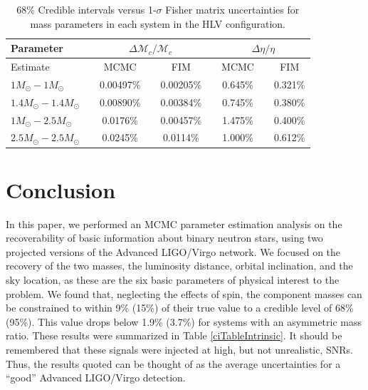 \documentclass[11pt,a4paper]{emulateapj} 
\begin{document}
\begin{table}[b!]
\centering
\caption{68\% Credible intervals versus 1-$\sigma$ Fisher matrix uncertainties for mass parameters in each system in the HLV configuration.}
  \tabcolsep=0.11cm
    {\renewcommand{\arraystretch}{1.3} 
\begin{tabular}{lcccccccc}

\hline\hline Parameter & \vline & \multicolumn{3}{c}{$\Delta\mathcal{M}_c / \mathcal{M}_c$} & \vline & \multicolumn{3}{c}{$\Delta \eta / \eta$} \\ \hline \hline

Estimate & \vline & MCMC & \vline & FIM & \vline & MCMC & \vline & FIM \\ \hline

$1M_{\odot}-1M_{\odot}$ & \vline &  0.00497\% & \vline & 0.00205\% & \vline & 0.645\% & \vline & 0.321\% \\
$1.4M_{\odot}-1.4M_{\odot}$ & \vline &  0.00890\% & \vline & 0.00384\% & \vline & 0.745\% & \vline & 0.380\% \\
$1M_{\odot}-2.5M_{\odot}$& \vline &  0.0176\% & \vline & 0.00457\% & \vline & 1.475\% & \vline & 0.400\% \\
$2.5M_{\odot}-2.5M_{\odot}$& \vline &  0.0245\% & \vline & 0.0114\% & \vline & 1.000\% & \vline & 0.612\% \\

\hline\hline

\end{tabular}}
\label{FIMvsMCMC}
\end{table}

\section{Conclusion}
\label{conclusionSection}

In this paper, we performed an MCMC parameter estimation analysis on
the recoverability of basic information about binary neutron stars,
using two projected versions of the Advanced LIGO/Virgo network.  We
focused on the recovery of the two masses, the luminosity distance,
orbital inclination, and the sky location, as these are the six basic
parameters of physical interest to the problem.  We found that,
neglecting the effects of spin, the component masses can be
constrained to within 9\% (15\%) of their true value to a credible level of
68\% (95\%).  This value drops below 1.9\% (3.7\%) for systems with an asymmetric mass
ratio.  These results were summarized in Table \ref{ciTableIntrinsic}.
It should be remembered that these signals were injected at high, 
but not unrealistic, SNRs.  Thus, the results quoted can be thought of as the
average uncertainties for a ``good'' Advanced LIGO/Virgo detection.
\end{document}
